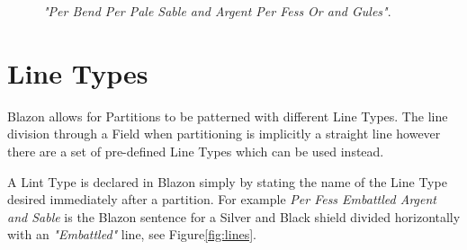 \begin{figure}[H]
\hfill
{}
\hfill
\caption{\emph{"Per Bend Per Pale Sable and Argent Per Fess Or and Gules"}.}
\end{figure}

\section{Line Types}

Blazon allows for Partitions to be patterned with different Line Types.  The line division through a Field when partitioning is implicitly a straight line however there are a set of pre-defined Line Types which can be used instead.  

A Lint Type is declared in Blazon simply by stating the name of the Line Type desired immediately after a partition. For example \emph{Per Fess Embattled Argent and Sable} is the Blazon sentence for a Silver and Black shield divided horizontally with an \emph{"Embattled"} line, see Figure\ref{fig:lines}.  

